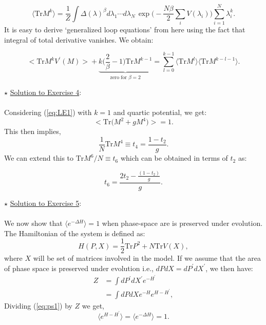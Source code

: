 \documentclass[letter,11pt]{article}
\begin{document}
\begin{equation} 
\langle \mbox{Tr} M^k  \rangle = \frac{1}{Z} \int \Delta(\lambda)^{\beta} 
	d\lambda_1 \cdots d\lambda_{N~} \exp\Bigg(-\frac{N\beta}{2} \sum_{i} V(\lambda_{i})\Bigg)  \sum_{i=1}^{N} \lambda_{i}^k.
\end{equation}
It is easy to derive `generalized loop equations' from here using the fact that integral 
of total derivative vanishes. We obtain:

\begin{equation}
		\Big< \mathrm{Tr} M^{k} V^{\prime}(M) \Big> +  \underbrace{k \Bigg(\frac{2}{\beta} - 1 \Bigg) \mathrm{Tr} M^{k-1}}_{\text{zero for $\beta=2$}} = \sum_{l=0}^{k-1} \langle \mathrm{Tr} M^{l} \rangle  \langle \mathrm{Tr} M^{k-l-1} \rangle. 
\end{equation}
 
\noindent $\star$ \ul{Solution to Exercise 4}:
\\ \\ Considering (\ref{eq:LE1}) with $k=1$ and quartic potential, we get: 
    \begin{equation}
    \Big< \mathrm{Tr}\Big(M^{2} + g M^{4}\Big) \Big> = 1. 
    \end{equation}
    This then implies, 
     \begin{equation}
     \frac{1}{N} \mathrm{Tr} M^{4} \equiv t_{4} =  \frac{1 - t_2}{g}. 
     \end{equation}
     We can extend this to $\mathrm{Tr} M^{6}/N \equiv t_{6}$ which can be obtained in terms of 
     $t_2$ as:  
     
     \begin{equation}
     	t_{6} = \frac{2t_{2} - \frac{(1-t_{2})}{g}}{g}. 
     \end{equation} 

\noindent $\star$ \ul{Solution to Exercise 5}:
\\ \\ We now show that $ \langle e^{-\Delta H} \rangle = 1$ when phase-space are is preserved under evolution. The Hamiltonian of the system is defined as:
\begin{equation}
	H(P,X) = \frac{1}{2} \mbox{Tr} P^2  + N \mbox{Tr} V(X), 
\end{equation} 
where $X$ will be set of matrices involved in the model. If we assume that the area of phase space is preserved under evolution i.e., $dP dX = dP^{\prime} dX^{\prime}$, we then have:
\begin{align}
	\label{eq:ps1} 
	Z &= \int dP^{\prime} dX^{\prime} e^{-H^{\prime} \nonumber }  \\
	&=  \int dP dX e^{-H} e^{H-H^{\prime}},
\end{align}
Dividing (\ref{eq:ps1}) by $Z$ we get, 
\begin{equation}
	\langle e^{H-H^{\prime}} \rangle = \langle e^{-\Delta H} \rangle = 1.
\end{equation}
\end{document}
